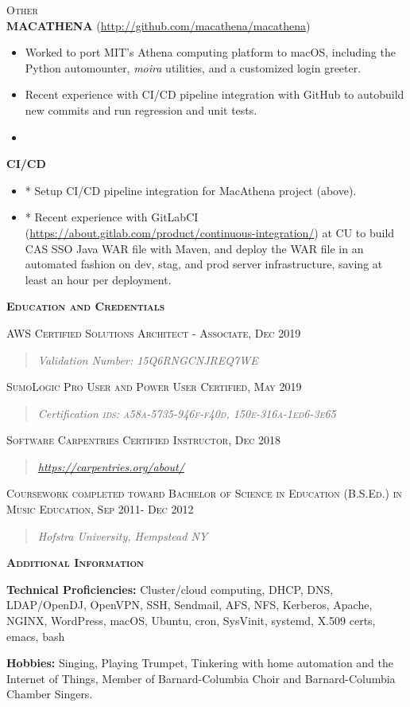 \documentclass[]{article}
\begin{document}
\textsc{Other}\\
\textbf{MACATHENA} (\url{http://github.com/macathena/macathena})

\begin{itemize}
\item
  Worked to port MIT's Athena computing platform to macOS, including the
  Python automounter, \emph{moira} utilities, and a customized login
  greeter.
\item
  Recent experience with CI/CD pipeline integration with GitHub to
  autobuild new commits and run regression and unit tests.
\item
\end{itemize}

\textbf{CI/CD }

\begin{itemize}
\item
  * Setup CI/CD pipeline integration for MacAthena project (above).
\item
  * Recent experience with GitLabCI
  (\url{https://about.gitlab.com/product/continuous-integration/}) at CU
  to build CAS SSO Java WAR file with Maven, and deploy the WAR file in
  an automated fashion on dev, stag, and prod server infrastructure,
  saving at least an hour per deployment.
\end{itemize}

\textbf{\textsc{Education and Credentials}}

\textsc{{AWS Certified Solutions Architect - Associate, Dec 2019}}

\begin{quote}
\emph{Validation Number\textsc{: 15Q6RNGCNJREQ7WE }}
\end{quote}

\textsc{{SumoLogic Pro User and Power User Certified, May 2019}}

\begin{quote}
\emph{Certification \textsc{ids: a58a-5735-946f-f40d,
150e-316a-1ed6-3e65 }}
\end{quote}

\textsc{{Software Carpentries Certified Instructor, Dec 2018}}

\begin{quote}
\emph{\url{https://carpentries.org/about/} }
\end{quote}

\textsc{{Coursework completed toward Bachelor of Science in Education
(B.S.Ed.) in Music Education, Sep 2011- Dec 2012}}

\begin{quote}
\emph{Hofstra University, Hempstead NY}
\end{quote}

\textbf{\textsc{Additional Information}}

\textbf{Technical Proficiencies:} Cluster/cloud computing, DHCP, DNS,
LDAP/OpenDJ, OpenVPN, SSH, Sendmail, AFS, NFS, Kerberos, Apache, NGINX,
WordPress, macOS, Ubuntu, cron, SysVinit, systemd, X.509 certs, emacs,
bash

\textbf{Hobbies:} Singing, Playing Trumpet, Tinkering with home
automation and the Internet of Things, Member of Barnard-Columbia Choir
and Barnard-Columbia Chamber Singers.
\end{document}
